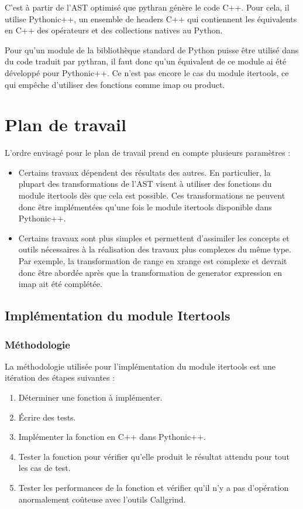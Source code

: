 \documentclass[a4paper]{article}
\begin{document}
\label{Pythonicpp}

C'est à partir de l'AST optimisé que pythran génère le code C++. Pour
cela, il utilise Pythonic++, un ensemble de headers C++ qui
contiennent les équivalents en C++ des opérateurs et des collections
natives au Python.

Pour qu'un module de la bibliothèque standard de Python puisse être
utilisé dans du code traduit par pythran, il faut donc qu'un
équivalent de ce module ai été développé pour Pythonic++. Ce n'est pas
encore le cas du module itertools, ce qui empêche d'utiliser des
fonctions comme imap ou product.

\section{Plan de travail}

L'ordre envisagé pour le plan de travail prend en compte plusieurs
paramètres :

\begin{itemize}
\item Certains travaux dépendent des résultats des autres. En
  particulier, la plupart des transformations de l'AST visent à
  utiliser des fonctions du module itertools dès que cela est
  possible. Ces transformations ne peuvent donc être implémentées
  qu'une fois le module itertools disponible dans Pythonic++.
\item Certains travaux sont plus simples et permettent d'assimiler les
  concepts et outils nécessaires à la réalisation des travaux plus
  complexes du même type. Par exemple, la transformation de range en
  xrange est complexe et devrait donc être abordée après que la
  transformation de generator expression en imap ait été complétée.
\end{itemize}

\subsection{Implémentation du module Itertools}

\subsubsection{Méthodologie}

La méthodologie utilisée pour l'implémentation du module itertools est
une itération des étapes suivantes :

\begin{enumerate}
\item Déterminer une fonction à implémenter.
\item Écrire des tests.
\item Implémenter la fonction en C++ dans Pythonic++.
\item Tester la fonction pour vérifier qu'elle produit le résultat
    attendu pour tout les cas de test.
\item Tester les performances de la fonction et vérifier qu'il n'y a
    pas d'opération anormalement coûteuse avec l'outils Callgrind.
\end{enumerate}
\end{document}
